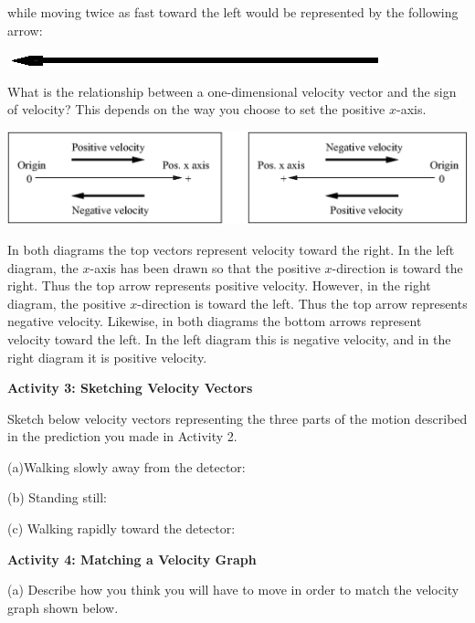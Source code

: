 while moving twice as fast toward the left would be represented by the following
arrow:

\vspace{0.3cm}
{\par\centering \includegraphics{velocity/velocity_fig5.eps} \par}
\vspace{0.3cm}

What is the relationship between a one-dimensional velocity vector and the sign
of velocity? This depends on the way you choose to set the positive $x$-axis.

\vspace{0.3cm}
{\par\centering \includegraphics{velocity/velocity_fig6.eps} \par}
\vspace{0.3cm}

In both diagrams the top vectors represent velocity toward the right. In the
left diagram, the $x$-axis has been drawn so that the positive $x$-direction is
toward the right. Thus the top arrow represents positive velocity. However,
in the right diagram, the positive $x$-direction is toward the left. Thus the
top arrow represents negative velocity. Likewise, in both diagrams the bottom
arrows represent velocity toward the left. In the left diagram this is negative
velocity, and in the right diagram it is positive velocity.

\textbf{Activity 3: Sketching Velocity Vectors} 

Sketch below velocity vectors representing the three parts of the motion described
in the prediction you made in Activity 2.

(a)Walking slowly away from the detector:
\answerspace{8mm}

(b) Standing still:
\answerspace{8mm}

(c) Walking rapidly toward the detector:
\answerspace{8mm}

\pagebreak[2]
\textbf{Activity 4: Matching a Velocity Graph} 

(a) Describe how you think you will have to move in order to match the velocity
graph shown below.

